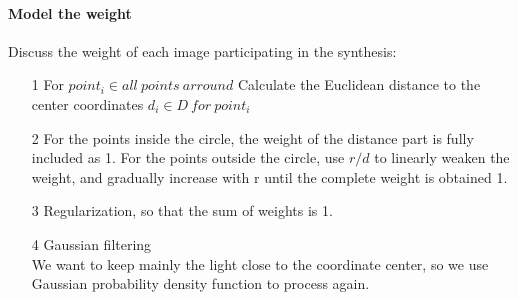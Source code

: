 \documentclass[letterpaper,12pt]{article}
\begin{document}
\paragraph{Model the weight}
Discuss the weight of each image participating in the synthesis:
\begin{itemize}
	\item[1]For $point_i \in all\ points\ arround$ Calculate the Euclidean distance to the center coordinates $d_i \in D\ for\ point_i$
	\item[2]For the points inside the circle, the weight of the distance part is fully included as 1. For the points outside the circle, use $r/d$ to linearly weaken the weight, and gradually increase with r until the complete weight is obtained 1.
	\item[3]Regularization, so that the sum of weights is 1.
	\item[4]Gaussian filtering\\
	We want to keep mainly the light close to the coordinate center, so we use Gaussian probability density function to process again.
\end{itemize}
\end{document}

